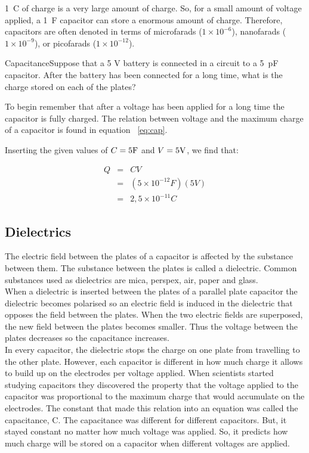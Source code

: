 1~C of charge is a very large amount of charge.  So, for a small
amount of voltage applied, a 1~F capacitor can store a enormous
amount of charge. Therefore, capacitors are often denoted in terms
of microfarads ($1\times10^{-6}$), nanofarads ($1\times10^{-9}$),
or  picofarads ($1\times10^{-12}$).


\begin{wex}{Capacitance}{Suppose that a 5 V battery is connected in a circuit to
a 5~pF capacitor.  After the battery has been connected for a long time, what is
the charge stored on each of the plates?}
{To begin remember that after a voltage has been applied for a
long time the capacitor is fully charged. The relation between
voltage and the maximum charge of a capacitor is found in equation
~\ref{eq:cap}. 

Inserting the given values of $C=5 {\rm F}$ and $V= 5 {\rm V}$, we find that:

\begin{eqnarray*}
Q &=& CV \\
 &=& (5\times10^{-12}F)(5V) \\
& = & 2,5\times10^{-11}C
\end{eqnarray*}

}
\end{wex}

\subsection{Dielectrics}
The electric field between the plates of a capacitor is affected by the substance between them. The substance between the plates is called a dielectric. Common substances used as dielectrics are mica, perspex, air, paper and glass.\\
When a dielectric is inserted between the plates of a parallel
plate capacitor the dielectric becomes polarised so an electric
field is induced in the dielectric that opposes the field between
the plates. When the two electric fields are superposed, the new
field between the plates becomes smaller. Thus the voltage between
the plates decreases so the capacitance increases.\\
 
In every capacitor, the dielectric stops the charge on one plate
from travelling to the other plate.  However, each capacitor is
different in how much charge it allows to build up on the
electrodes per voltage applied.  When scientists started studying
capacitors they discovered the property that the voltage applied
to the capacitor was proportional to the maximum charge that would
accumulate on the electrodes.  The constant that made this
relation into an equation was called the capacitance, C. The
capacitance was different for different capacitors. But, it stayed
constant no matter how much voltage was applied.  So, it predicts
how much charge will be stored on a capacitor when different
voltages are applied.


